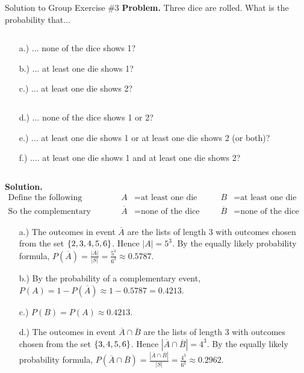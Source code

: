 \documentclass[10pt]{beamer}
\begin{document}
\begin{frame}{Solution to Group Exercise \#3}
\scriptsize 
 \colorbox{blue!30}{\textbf{Problem.}} Three dice are rolled.  What is the probability that...
    \begin{columnsonlytextwidth}
    \begin{column}{0.35\textwidth}
        \begin{itemize} \tiny 
		\item[a.)] ... none of the dice shows 1? 
		\item[b.)] ... at least one die shows 1? 
		\item[c.)] ... at least one die shows 2?
        \end{itemize}
    \end{column}
    \begin{column}{0.55\textwidth}
        \begin{itemize}  \tiny 
		\item[d.)] ... none of the dice shows 1 or 2?
		\item[e.)]  ... at least one die shows 1 or at least one die shows 2 (or both)? 
		\item[f.)] .... at least one die shows 1 and at least one die shows 2?
        \end{itemize}
    \end{column}
    \end{columnsonlytextwidth}
 \vfill 
  \colorbox{green!30}{\textbf{Solution.}}  
\begin{align*}
\text{Define the following events} &&  A &= \text{at least one die shows 1} &\quad  B &= \text{at least one die shows 2} \\
 \text{So the complementary events are}&&  \overline{A} &= \text{none of the dice show 1} &\quad   \overline{B} &= \text{none of the dice show 2}
\end{align*}
%
\vspace{-.5cm}
 \begin{itemize}
\item[a.)]  The outcomes in event $\overline{A}$ are the lists of length 3 with outcomes chosen from the set $\{ {2,3,4,5,6} \}$.  Hence $|A| = 5^3$. By the equally likely probability formula,  $P(\overline{A}) = \frac{|A|}{|S|} = \frac{5^3}{6^3} \approx  0.5787$.   
\item[b.)] By the probability of a complementary event, $P(A) =  1- P(\overline{A}) \approx 1-0.5787 = 0.4213$. 
\item[c.)] $P(B) = P(A) \approx 0.4213$.
\item[d.)] The outcomes in event $\overline{A} \cap \overline{B}$ are the lists of length 3 with outcomes chosen from the set $\{ {3,4,5,6} \}$.   Hence $|\overline{A} \cap \overline{B}| = 4^3$. By the equally likely probability formula,  $P(\overline{A} \cap \overline{B}) = \frac{|\overline{A} \cap \overline{B}|}{|S|} = \frac{4^3}{6^3} \approx  0.2962$. 

\end{itemize}
\end{frame}
\end{document}
